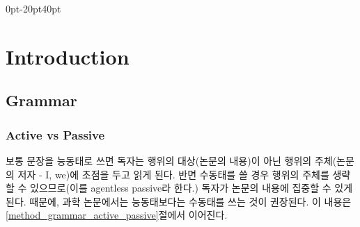 \documentclass[10pt]{report}
\begin{document}
	
	\titleformat{\chapter}[display]
	{\normalfont\huge\bfseries}{\chaptertitlename\ \thechapter}{20pt}{\Huge}
	\titlespacing*{\chapter}
	{0pt}{-20pt}{40pt}
	
	
	\tableofcontents
	
	\chapter{Introduction}
	
	\section{Grammar}
	
	\subsection{Active vs Passive} \label{intro_grammar_active_passive}
	보통 문장을 능동태로 쓰면 독자는 행위의 대상(논문의 내용)이 아닌 행위의 주체(논문의 저자 - I, we)에 초점을 두고 읽게 된다. 반면 수동태를 쓸 경우 행위의 주체를 생략할 수 있으므로(이를 agentless passive라 한다.) 독자가 논문의 내용에 집중할 수 있게 된다. 때문에, 과학 논문에서는 능동태보다는 수동태를 쓰는 것이 권장된다. 이 내용은 \ref{method_grammar_active_passive}절에서 이어진다.
	
\end{document}
